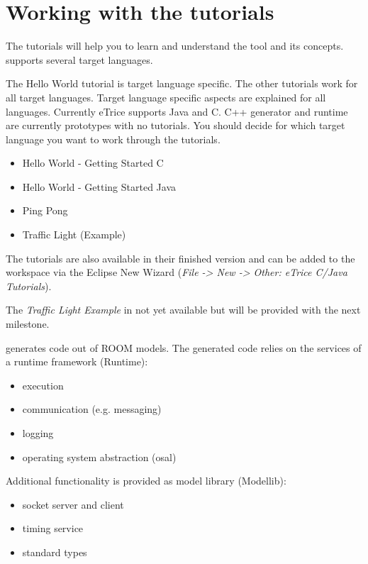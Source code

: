 \section{Working with the tutorials}

The \eTrice{} tutorials will help you to learn and understand the \eTrice{} tool and its concepts. \eTrice{} supports 
several target languages.

The Hello World tutorial is target language specific. The other tutorials work for all target languages. Target language specific aspects are explained for all languages. 
Currently eTrice supports Java and C. C++ generator and runtime are currently prototypes with no tutorials. You should decide for which target language you want to work through the tutorials. 

\begin{itemize}
	\item Hello World - Getting Started C
	\item Hello World - Getting Started Java
	\item Ping Pong 
	\item Traffic Light (Example)
\end{itemize}

The tutorials are also available in their finished version and can be added to the workspace via the Eclipse New Wizard (\emph{File -> New -> Other: eTrice C/Java Tutorials}).

The \emph{Traffic Light Example} in not yet available but will be provided with the next \eTrice{} milestone.

\eTrice{} generates code out of ROOM models. The generated code relies on the services of a runtime framework (Runtime):
\begin{itemize}
\item execution
\item communication (e.g. messaging)
\item logging
\item operating system abstraction (osal)
\end{itemize}

Additional functionality is provided as model library (Modellib): 
\begin{itemize}
\item socket server and client
\item timing service
\item standard types
\end{itemize}
 
